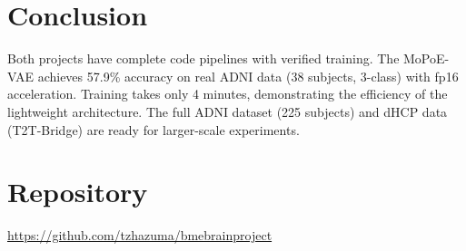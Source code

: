 \documentclass[11pt,a4paper]{article}
\begin{document}
\section{Conclusion}
Both projects have complete code pipelines with verified training. The MoPoE-VAE achieves 57.9\% accuracy on real ADNI data (38 subjects, 3-class) with fp16 acceleration. Training takes only 4 minutes, demonstrating the efficiency of the lightweight architecture. The full ADNI dataset (225 subjects) and dHCP data (T2T-Bridge) are ready for larger-scale experiments.

\section{Repository}
\url{https://github.com/tzhazuma/bmebrainproject}
\end{document}
